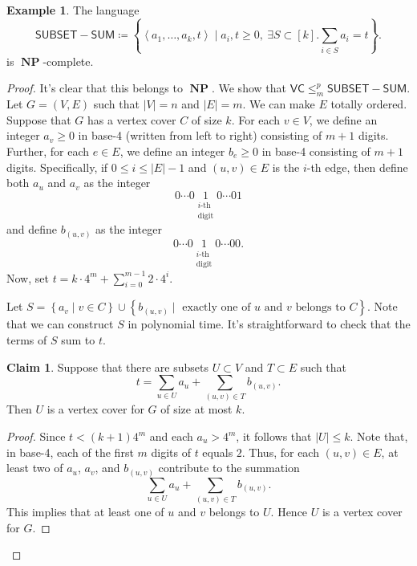 \documentclass[10pt,letterpaper,cm]{nupset}
\theoremstyle{definition}
\newtheorem{exmp}[definition]{Example}
\theoremstyle{theorem}
\newtheorem*{claim}{Claim}
\theoremstyle{remark}
\newcommand{\1}{\mathbf{1}}
\newcommand{\0}{\vec 0}
\DeclareMathOperator{\NP}{\mathbf{NP}}
\begin{document}
\begin{exmp}
The language  $$\mathsf{SUBSET{-}SUM} \coloneqq \left\{\left\langle a_1, \ldots, a_k, t\right\rangle \mid a_i,t\geq 0,\ \exists S \subset [k].\sum_{i\in S} a_i = t\right\}.$$ is $\NP$-complete.
\end{exmp}
\begin{proof}
It's clear that this belongs to $\NP$. We show that $\mathsf{VC} \leq_m^p \mathsf{SUBSET{-}SUM}$. Let $G=\left(V, E\right)$ such that $\left\lvert{V}\right\rvert = n$ and $\left\lvert{E}\right\rvert= m$. We can make $E$ totally ordered. Suppose that $G$ has a vertex cover $C$ of size $k$. For each $v\in V$, we define an integer $a_v\geq 0$ in base-4 (written from left to right) consisting of $m+1$ digits. Further, for each $e\in E$, we define an integer $b_e\geq 0$ in base-4 consisting of $m+1$ digits. Specifically, if $0\leq i \leq \left\lvert{E}\right\rvert-1$ and  $\left(u,v\right) \in E$ is the $i$-th edge, then define both $a_u$ and $a_v$  as the integer $$0 \cdots 0 \underset{\substack{\text{$i$-th} \\ \text{digit}}}{1} 0 \cdots 01   $$ and define $b_{(u,v)}$ as the integer $$0 \cdots 0  \underset{\substack{\text{$i$-th} \\ \text{digit}}}{1} 0 \cdots 00     .$$ Now, set $t= k \cdot 4^m + \sum_{i=0}^{m-1}2 \cdot 4^i$.

\medskip

 Let $S = \left\{a_v \mid v\in C\right\} \cup \left\{b_{(u,v)} \mid\text{ exactly one of }u\text{ and }v\text{ belongs to }C\right\}$. Note that we can construct $S$ in polynomial time. It's straightforward to check that the terms of $S$ sum to $t$. 
\begin{claim}
Suppose that there are subsets $U\subset V$ and $T\subset E$ such that $$t= \sum_{u\in U}a_u +\sum_{(u,v) \in T} b_{(u,v)}.$$ Then $U$ is a vertex cover for $G$ of size at most $k$.
\end{claim}
\begin{proof}
Since $t<(k+1)4^m$ and each $a_u> 4^m$, it follows that $\left\lvert{U}\right\rvert\leq k$. Note that, in base-4, each of the first $m$ digits of $t$ equals $2$. Thus, for each $\left(u,v\right) \in E$, at least two of $a_u$, $a_v$, and $b_{(u,v)}$ contribute to the summation $$\sum_{u\in U}a_u +\sum_{(u,v) \in T} b_{(u,v)}.$$ This implies that at least one of $u$ and $v$ belongs to $U$. Hence $U$ is a vertex cover for $G$.
\end{proof}
\end{proof}
\end{document}
